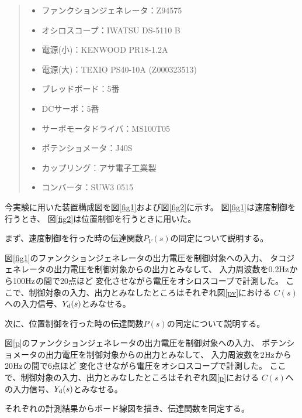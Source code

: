 \documentclass[uplatex, 11pt,a4j, titlepage]{jsarticle}
\begin{document}
\begin{quote}
    \begin{itemize}
        \item ファンクションジェネレータ：Z94575
        \item オシロスコープ：IWATSU DS-5110 B
        \item 電源(小)：KENWOOD PR18-1.2A
        \item 電源(大)：TEXIO PS40-10A (Z000323513)
        \item ブレッドボード：5番
        \item DCサーボ：5番
        \item サーボモータドライバ：MS100T05
        \item ポテンショメータ：J40S
        \item カップリング：アサ電子工業製
        \item コンバータ：SUW3 0515
    \end{itemize}
\end{quote}

今実験に用いた装置構成図を図\ref{fig1}および図\ref{fig2}に示す。
図\ref{fig1}は速度制御を行うとき、
図\ref{fig2}は位置制御を行うときに用いた。

\newpage 

まず、速度制御を行った時の伝達関数$P_{V}(s)$の同定について説明する。

図\ref{fig1}のファンクションジェネレータの出力電圧を制御対象への入力、
タコジェネレータの出力電圧を制御対象からの出力とみなして、
入力周波数を0.2${\rm Hz}$から100${\rm Hz}$の間で20点ほど
変化させながら電圧をオシロスコープで計測した。
ここで、制御対象の入力、出力とみなしたところはそれぞれ図\ref{pv}における
$C(s)$への入力信号、$Y_{\rm d}(s)$とみなせる。

次に、位置制御を行った時の伝達関数$P(s)$の同定について説明する。

図\ref{p}のファンクションジェネレータの出力電圧を制御対象への入力、
ポテンショメータの出力電圧を制御対象からの出力とみなして、
入力周波数を2${\rm Hz}$から20${\rm Hz}$の間で6点ほど
変化させながら電圧をオシロスコープで計測した。
ここで、制御対象の入力、出力とみなしたところはそれぞれ図\ref{p}における
$C(s)$への入力信号、$Y_{\rm d}(s)$とみなせる。

それぞれの計測結果からボード線図を描き、伝達関数を同定する。
\end{document}
